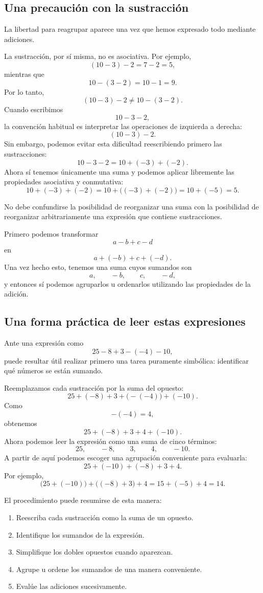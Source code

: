 \subsection{Una precaución con la sustracción}

La libertad para reagrupar aparece una vez que hemos expresado todo mediante adiciones.

La sustracción, por sí misma, no es asociativa.
Por ejemplo,
\[
(10-3)-2=7-2=5,
\]
mientras que
\[
10-(3-2)=10-1=9.
\]
Por lo tanto,
\[
(10-3)-2\neq10-(3-2).
\]
Cuando escribimos
\[
10-3-2,
\]
la convención habitual es interpretar las operaciones de izquierda a derecha:
\[
(10-3)-2.
\]
Sin embargo, podemos evitar esta dificultad reescribiendo primero las sustracciones:
\[
10-3-2
=
10+(-3)+(-2).
\]
Ahora sí tenemos únicamente una suma y podemos aplicar libremente las propiedades asociativa y conmutativa:
\[
10+(-3)+(-2)
=
10+\bigl((-3)+(-2)\bigr)
=
10+(-5)
=
5.
\]

\begin{note}
No debe confundirse la posibilidad de reorganizar una suma con la posibilidad de reorganizar arbitrariamente una expresión que contiene sustracciones.

Primero podemos transformar
\[
a-b+c-d
\]
en
\[
a+(-b)+c+(-d).
\]
Una vez hecho esto, tenemos una suma cuyos sumandos son
\[
a,\qquad -b,\qquad c,\qquad -d,
\]
y entonces sí podemos agruparlos u ordenarlos utilizando las propiedades de la adición.
\end{note}

\subsection{Una forma práctica de leer estas expresiones}

Ante una expresión como
\[
25-8+3-(-4)-10,
\]
puede resultar útil realizar primero una tarea puramente simbólica: identificar qué números se están sumando.

Reemplazamos cada sustracción por la suma del opuesto:
\[
25+(-8)+3+\bigl(-(-4)\bigr)+(-10).
\]
Como
\[
-(-4)=4,
\]
obtenemos
\[
25+(-8)+3+4+(-10).
\]
Ahora podemos leer la expresión como una suma de cinco términos:
\[
25,\qquad-8,\qquad3,\qquad4,\qquad-10.
\]
A partir de aquí podemos escoger una agrupación conveniente para evaluarla:
\[
25+(-10)+(-8)+3+4.
\]
Por ejemplo,
\[
\bigl(25+(-10)\bigr)+\bigl((-8)+3\bigr)+4
=
15+(-5)+4
=
14.
\]

El procedimiento puede resumirse de esta manera:
\begin{enumerate}
\item Reescriba cada sustracción como la suma de un opuesto.
\item Identifique los sumandos de la expresión.
\item Simplifique los dobles opuestos cuando aparezcan.
\item Agrupe u ordene los sumandos de una manera conveniente.
\item Evalúe las adiciones sucesivamente.
\end{enumerate}


